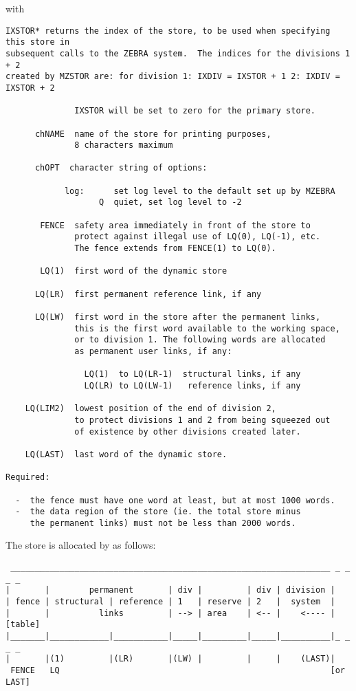 with
\begin{verbatim}
IXSTOR* returns the index of the store, to be used when specifying this store in
subsequent calls to the ZEBRA system.  The indices for the divisions 1 + 2
created by MZSTOR are: for division 1: IXDIV = IXSTOR + 1 2: IXDIV = IXSTOR + 2

              IXSTOR will be set to zero for the primary store.

      chNAME  name of the store for printing purposes,
              8 characters maximum

      chOPT  character string of options:

            log:      set log level to the default set up by MZEBRA
                   Q  quiet, set log level to -2

       FENCE  safety area immediately in front of the store to
              protect against illegal use of LQ(0), LQ(-1), etc.
              The fence extends from FENCE(1) to LQ(0).

       LQ(1)  first word of the dynamic store

      LQ(LR)  first permanent reference link, if any

      LQ(LW)  first word in the store after the permanent links,
              this is the first word available to the working space,
              or to division 1. The following words are allocated
              as permanent user links, if any:

                LQ(1)  to LQ(LR-1)  structural links, if any
                LQ(LR) to LQ(LW-1)   reference links, if any

    LQ(LIM2)  lowest position of the end of division 2,
              to protect divisions 1 and 2 from being squeezed out
              of existence by other divisions created later.

    LQ(LAST)  last word of the dynamic store.

Required:

  -  the fence must have one word at least, but at most 1000 words.
  -  the data region of the store (ie. the total store minus
     the permanent links) must not be less than 2000 words.
\end{verbatim} 

The store is allocated by  as follows:

\begin{verbatim}
 _________________________________________________________________ _ _ _ _ 
|       |        permanent       | div |         | div | division |
| fence | structural | reference | 1   | reserve | 2   |  system  | 
|       |          links         | --> | area    | <-- |    <---- | [table]
|_______|____________|___________|_____|_________|_____|__________|_ _ _ _ 
|       |(1)         |(LR)       |(LW) |         |     |    (LAST)| 
 FENCE   LQ                                                       [or LAST]
\end{verbatim} 

